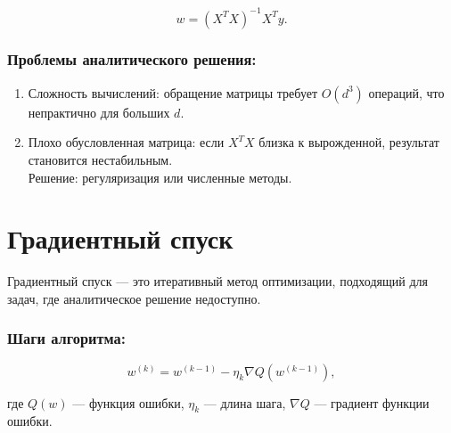 \begin{equation}
w = (X^TX)^{-1}X^Ty.
\end{equation}

\hypertarget{ux43fux440ux43eux431ux43bux435ux43cux44b-ux430ux43dux430ux43bux438ux442ux438ux447ux435ux441ux43aux43eux433ux43e-ux440ux435ux448ux435ux43dux438ux44f}{%
\subsubsection*{Проблемы аналитического
решения:}\label{ux43fux440ux43eux431ux43bux435ux43cux44b-ux430ux43dux430ux43bux438ux442ux438ux447ux435ux441ux43aux43eux433ux43e-ux440ux435ux448ux435ux43dux438ux44f}}

\begin{enumerate}
\def\labelenumi{\arabic{enumi}.}
\tightlist
\item
  Сложность вычислений: обращение матрицы требует
  \(O(d^3)\) операций, что непрактично для больших \(d\).
\item
  Плохо обусловленная матрица: если \(X^TX\) близка к
  вырожденной, результат становится нестабильным.\\
  Решение: регуляризация или численные методы.
\end{enumerate}

\hypertarget{ux433ux440ux430ux434ux438ux435ux43dux442ux43dux44bux439-ux441ux43fux443ux441ux43a}{%
\section{Градиентный
спуск}\label{ux433ux440ux430ux434ux438ux435ux43dux442ux43dux44bux439-ux441ux43fux443ux441ux43a}}

Градиентный спуск --- это итеративный метод оптимизации, подходящий для
задач, где аналитическое решение недоступно.

\hypertarget{ux448ux430ux433ux438-ux430ux43bux433ux43eux440ux438ux442ux43cux430}{%
\subsubsection*{Шаги
алгоритма:}\label{ux448ux430ux433ux438-ux430ux43bux433ux43eux440ux438ux442ux43cux430}}

\begin{equation}
w^{(k)} = w^{(k-1)} - \eta_k \nabla Q(w^{(k-1)}),
\end{equation}

где  \(Q(w)\) --- функция ошибки, \(\eta_k\) --- длина шага, 
\(\nabla Q\) --- градиент функции ошибки.

